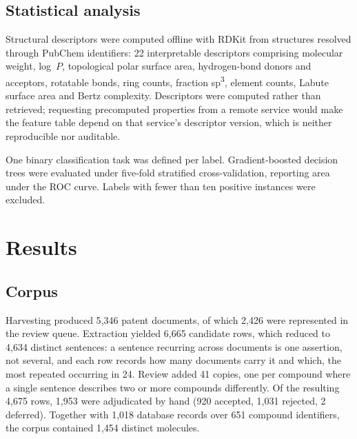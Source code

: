 \documentclass[
  computerscience
]{genesisl1-paper}
\begin{document}
\subsection{Statistical analysis}

Structural descriptors were computed offline with RDKit from structures resolved through
PubChem identifiers: 22 interpretable descriptors comprising molecular weight, log~$P$,
topological polar surface area, hydrogen-bond donors and acceptors, rotatable bonds, ring
counts, fraction sp\textsuperscript{3}, element counts, Labute surface area and Bertz
complexity. Descriptors were computed rather than retrieved; requesting precomputed
properties from a remote service would make the feature table depend on that service's
descriptor version, which is neither reproducible nor auditable.

One binary classification task was defined per label. Gradient-boosted decision trees were
evaluated under five-fold stratified cross-validation, reporting area under the ROC curve.
Labels with fewer than ten positive instances were excluded.


\section{Results}

\subsection{Corpus}

Harvesting produced 5{,}346 patent documents, of which 2{,}426 were represented in the
review queue. Extraction yielded 6{,}665 candidate rows, which reduced to 4{,}634 distinct
sentences: a sentence recurring across documents is one assertion, not several, and each
row records how many documents carry it and which, the most repeated occurring in 24.
Review added 41 copies, one per compound where a single sentence describes two or more
compounds differently. Of the resulting 4{,}675 rows, 1{,}953 were adjudicated by hand
(920 accepted, 1{,}031 rejected, 2 deferred). Together with 1{,}018 database records over
651 compound identifiers, the corpus contained 1{,}454 distinct molecules.
\end{document}
